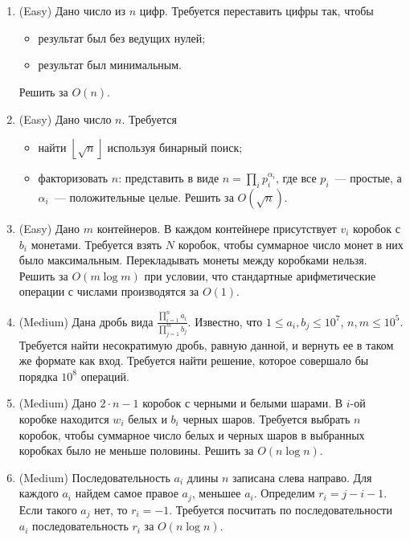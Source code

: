 \section{}

\begin{enumerate}

  \item (Easy) Дано число из $n$ цифр. Требуется переставить цифры так, чтобы
	\begin{itemize}
		\item результат был без ведущих нулей;
		\item результат был минимальным.
	\end{itemize}
	Решить за $O(n)$.

  \item (Easy) Дано число $n$. Требуется 
	\begin{itemize}
	  \item найти $\left\lfloor \sqrt{n} \right\rfloor$ используя бинарный поиск;
	  \item факторизовать $n$: представить в виде $n = \prod_{i} p_i^{\alpha_i}$, где
		все $p_i$~--- простые, а $\alpha_i$~--- положительные целые. Решить за $O(\sqrt{n})$.
    \end{itemize}

  \item (Easy) Дано $m$ контейнеров. В каждом контейнере присутствует 
	$v_i$ коробок с $b_i$ монетами. Требуется взять $N$ коробок, чтобы
	суммарное число монет в них было максимальным. Перекладывать монеты
	между коробками нельзя. Решить за $O(m \log m)$ при условии, что 
	стандартные арифметические операции с числами производятся за $O(1)$.

  \item (Medium) Дана дробь вида $\frac{\prod_{i=1}^n a_i}{\prod_{j=1}^m b_j}$.
	Известно, что $1 \leq a_i, b_j \leq 10^7$, $n, m \leq 10^5$. Требуется
	найти несократимую дробь, равную данной, и вернуть ее в таком же 
	формате как вход. Требуется найти решение, которое совершало бы 
	порядка $10^8$ операций.

  \item (Medium) Дано $2 \cdot n - 1$ коробок с черными и белыми шарами. 
	В $i$-ой коробке находится $w_i$ белых и $b_i$ черных шаров. Требуется
	выбрать $n$ коробок, чтобы суммарное число белых и черных шаров в 
	выбранных коробках было не меньше половины. Решить за $O(n \log n)$.

  \item (Medium) Последовательность $a_i$ длины $n$ записана слева направо.  
	Для каждого $a_i$ найдем самое правое $a_j$, меньшее $a_i$. Определим
	$r_i = j - i - 1$. Если такого $a_j$ нет, то $r_i = -1$. Требуется 
	посчитать по последовательности $a_i$ последовательность $r_i$ за $O(n \log n)$.


\end{enumerate}
